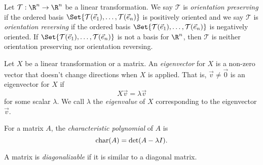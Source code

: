 \begin{SaveDefinition}[key=OrientationPreservingLinearTransformation, title={Orientation Preserving Linear Transformation}]
	Let $\mathcal T:\R^n\to\R^n$ be a linear transformation. We say $\mathcal T$
	is \emph{orientation preserving} if the ordered basis $\Set{\mathcal T(\vec e_1),\ldots, \mathcal T(\vec e_n)}$
	is positively oriented  and we say $\mathcal T$
	is \emph{orientation reversing} if the ordered basis $\Set{\mathcal T(\vec e_1),\ldots, \mathcal T(\vec e_n)}$
	is negatively oriented. If $\Set{\mathcal T(\vec e_1),\ldots, \mathcal T(\vec e_n)}$
	is not a basis for $\R^n$, then $\mathcal T$ is neither orientation preserving nor orientation reversing.
\end{SaveDefinition}

\begin{SaveDefinition}[key=Eigenvector, title={Eigenvector}]
	Let $X$ be a linear transformation or a matrix. An
	\emph{eigenvector} for $X$ is a non-zero vector that doesn't change
	directions when $X$ is applied. That is, $\vec v\neq \vec 0$ is an
	eigenvector for $X$ if
	\[
		X\vec v=\lambda \vec v
	\]
	 for some scalar $\lambda$. We call $\lambda$ the
	\emph{eigenvalue} of $X$ corresponding to the eigenvector $\vec v$.
\end{SaveDefinition}

\begin{SaveDefinition}[
	key=CharacteristicPolynomial,
	title={Characteristic Polynomial}]

	For a matrix $A$, the
	\emph{characteristic polynomial} of $A$ is
	\[
		\operatorname{char}(A)=\det(A-\lambda I).
	\]

\end{SaveDefinition}

\begin{SaveDefinition}[key=Diagonalizable, title={Diagonalizable}]
	A matrix is
	\emph{diagonalizable} if it is similar to a diagonal matrix.
\end{SaveDefinition}

